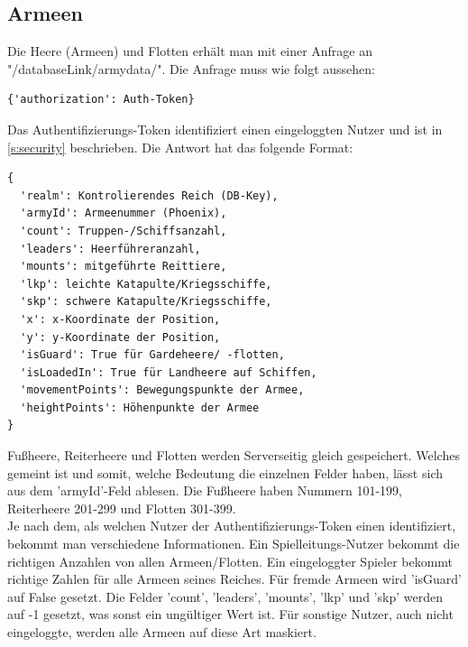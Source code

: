 \documentclass[11pt,a4paper,twocolumn]{article}
\begin{document}
\subsection{Armeen}\label{ss:read_armies}
Die Heere (Armeen) und Flotten erhält man mit einer Anfrage an "/databaseLink/armydata/". Die Anfrage muss wie folgt aussehen:
\begin{lstlisting}
{'authorization': Auth-Token}
\end{lstlisting}
Das Authentifizierungs-Token identifiziert einen eingeloggten Nutzer und ist in \ref{s:security} beschrieben. Die Antwort hat das folgende Format:
\begin{lstlisting}
{
  'realm': Kontrolierendes Reich (DB-Key),
  'armyId': Armeenummer (Phoenix),
  'count': Truppen-/Schiffsanzahl,
  'leaders': Heerführeranzahl,
  'mounts': mitgeführte Reittiere,
  'lkp': leichte Katapulte/Kriegsschiffe,
  'skp': schwere Katapulte/Kriegsschiffe,
  'x': x-Koordinate der Position,
  'y': y-Koordinate der Position,
  'isGuard': True für Gardeheere/ -flotten,
  'isLoadedIn': True für Landheere auf Schiffen,
  'movementPoints': Bewegungspunkte der Armee,
  'heightPoints': Höhenpunkte der Armee
}
\end{lstlisting}
Fußheere, Reiterheere und Flotten werden Serverseitig gleich gespeichert. Welches gemeint ist und somit, welche Bedeutung die einzelnen Felder haben, lässt sich aus dem 'armyId'-Feld ablesen. Die Fußheere haben Nummern 101-199, Reiterheere 201-299 und Flotten 301-399.\\
Je nach dem, als welchen Nutzer der Authentifizierungs-Token einen identifiziert, bekommt man verschiedene Informationen. Ein Spielleitungs-Nutzer bekommt die richtigen Anzahlen von allen Armeen/Flotten. Ein eingeloggter Spieler bekommt richtige Zahlen für alle Armeen seines Reiches. Für fremde Armeen wird 'isGuard' auf False gesetzt. Die Felder 'count', 'leaders', 'mounts', 'lkp' und 'skp' werden auf -1 gesetzt, was sonst ein ungültiger Wert ist. Für sonstige Nutzer, auch nicht eingeloggte, werden alle Armeen auf diese Art maskiert.
\end{document}

